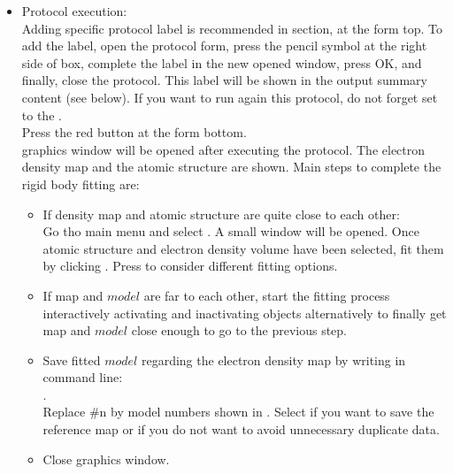 \begin{itemize}
\begin{itemize}
    \end{itemize}

  \item Protocol execution:\\
  
  Adding specific protocol label is recommended in  section, at the form top. To add the label, open the protocol form, press the pencil symbol at the right side of  box, complete the label in the new opened window, press OK, and finally, close the protocol. This label will be shown in the output summary content (see below). If you want to run again this protocol, do not forget set to  the .\\
  Press the  red button at the form bottom.\\
  
  \chimera graphics window will be opened after executing the protocol. The electron density map and the atomic structure are shown. Main steps to complete the rigid body fitting are:\\
  \begin{itemize}
   \item If density map and atomic structure are quite close to each other:\\Go tho \chimera main menu and select . A small  window will be opened. Once atomic structure and electron density volume have been selected, fit them by clicking . Press  to consider different fitting options.\\
   \item If map and $model$ are far to each other, start the fitting process interactively activating and inactivating \chimera objects alternatively to finally get map and $model$ close enough to go to the previous step.\\ 
   \item Save fitted $model$ regarding the electron density map by writing in \chimera command line:\\ .\\Replace \#n by model numbers shown in \chimera {}. Select  if you want to save the reference map or  if you do not want to avoid unnecessary duplicate data.
   \item Close \chimera graphics window.
  \end{itemize}
  

\end{itemize}
